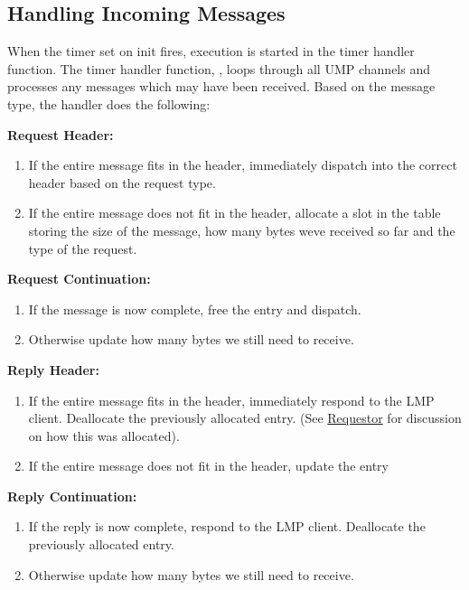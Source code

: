 \subsection{Handling Incoming Messages}
When the timer set on init fires, execution is started in the timer handler function. The timer handler function, , loops through all UMP channels and processes any messages which may have
 been received. Based on the message type, the handler does the following:
 \begin{description}
    \item \textbf{Request Header:}
    \begin{enumerate}
        \item If the entire message fits in the header, immediately dispatch into the correct header based on
        the request type.
        \item If the entire message does not fit in the header, allocate a slot in the  table storing the size of the message, how many bytes weve received so far 
        and the type of the request.
    \end{enumerate}
    \item \textbf{Request Continuation:}
    \begin{enumerate}
        \item If the message is now complete, free the  entry and dispatch.
        \item Otherwise update how many bytes we still need to receive.
    \end{enumerate}
    \item \textbf{Reply Header:}
    \begin{enumerate}
        \item If the entire message fits in the header, immediately respond to the LMP client. Deallocate the
        previously allocated  entry. (See \hyperref[sec:requestor]{Requestor} for discussion on how this was allocated).
        \item If the entire message does not fit in the header, update the   entry 
    \end{enumerate}
     \item \textbf{Reply Continuation:}
    \begin{enumerate}
        \item If the reply is now complete, respond to the LMP client. Deallocate the
        previously allocated  entry. 
        \item Otherwise update how many bytes we still need to receive.
    \end{enumerate}

 \end{description}

